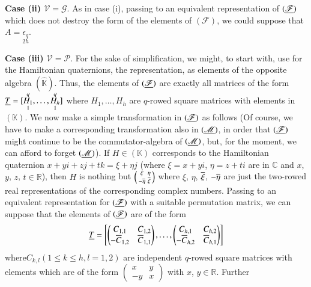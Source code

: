 \medskip
\noindent
{\bf Case (ii) {\boldmath$\mathscr{V}=\mathscr{G}$}}. As in case (i),
  passing to an equivalent representation of $(\underline{\mathscr{F}})$
  which does not destroy the form of the elements of $(\mathscr{F})$,
  we could suppose that $A=\underset{2h}{\epsilon_{q}}$. 

\medskip
\noindent
{\bf Case (iii) {\boldmath$\mathscr{V}=\mathscr{P}$}}. For the sake of
simplification, we might, to start with, use for the Hamiltonian
quaternions, the representation, as elements of the opposite algebra
$(\widehat{\mathbb{K}})$. Thus, the elements of $(\underline{\mathscr{F}})$
are exactly all matrices of the form
$\underline{T}=[\underset{1}{\overset{q}{H_{1}}},\ldots,\underset{1}{\overset{q}{H_{h}}}]$
where $H_{1},\ldots,H_{h}$ are $q$-rowed square matrices with elements
in $(\mathbb{K})$. We now make a simple transformation in
$(\underline{\mathscr{F}})$ as follows (Of course, we have to make a
corresponding transformation also in $(\underline{\mathscr{M}})$, in order
that $(\underline{\mathscr{F}})$ might continue to be the commutator-algebra
of $(\underline{\mathscr{M}})$, but, for the moment, we can afford to forget
$(\underline{\mathscr{M}})$). If $H\in (\mathbb{K})$ corresponds to the
Hamiltonian quaternion $x+yi+zj+tk=\xi+\eta j$ (where $\xi=x+yi$,
$\eta=z+ti$ are in $\mathbb{C}$ and $x$, $y$, $z$, $t\in \mathbb{R}$),
then $H$ is nothing but $\left(\begin{smallmatrix} \xi &
  \eta\\ -\overline{\eta} & \overline{\xi}
\end{smallmatrix}\right)$ where $\xi$, $\eta$, $\overline{\xi}$,
$-\overline{\eta}$ are just the two-rowed real representations of the
corresponding complex numbers. Passing to an equivalent representation
for $(\underline{\mathscr{F}})$ with a suitable permutation matrix, we can
suppose that the elements of $(\underline{\mathscr{F}})$ are of the form
$$
\underline{T}=\left[
\begin{pmatrix}
C_{1,1} & C_{1,2}\\
-\overline{C}_{1,2} & \overline{C}_{1,1}
\end{pmatrix},\ldots,
\begin{pmatrix}
C_{h,1} & C_{h,2}\\
-\overline{C}_{h,2} & \overline{C}_{h,1}
\end{pmatrix}
\right]
$$
where\pageoriginale $C_{k,l}(1\leq k\leq h,l=1,2)$ are independent
$q$-rowed square matrices with elements which are of the form
$\left(\begin{smallmatrix} x & y\\ -y & x
\end{smallmatrix}\right)$ with $x$, $y\in\mathbb{R}$. Further
